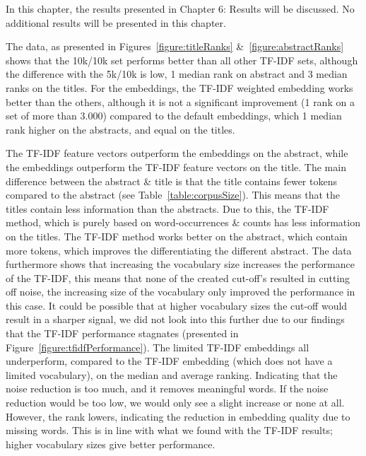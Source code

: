 \documentclass[../../Thesis.tex]{subfiles}
\begin{document}
In this chapter, the results presented in Chapter 6: Results will be discussed. No additional results will be presented in this chapter.

The data, as presented in Figures~\ref{figure:titleRanks} \&~\ref{figure:abstractRanks} shows that the 10k/10k set performs better than all other TF-IDF sets, although the difference with the 5k/10k is low, 1  median rank on abstract and 3 median ranks on the titles. For the embeddings, the TF-IDF weighted embedding works better than the others, although it is not a significant improvement (1 rank on a set of more than 3.000) compared to the default embeddings, which 1 median rank higher on the abstracts, and equal on the titles. 

The TF-IDF feature vectors outperform the embeddings on the abstract, while the embeddings outperform the TF-IDF feature vectors on the title. The main difference between the abstract \& title is that the title contains fewer tokens compared to the abstract (see Table~\ref{table:corpusSize}). This means that the titles contain less information than the abstracts. Due to this, the TF-IDF method, which is purely based on word-occurrences \& counts has less information on the titles. The TF-IDF method works better on the abstract, which contain more tokens, which improves the differentiating the different abstract. The data furthermore shows that increasing the vocabulary size increases the performance of the TF-IDF, this means that none of the created cut-off's resulted in cutting off noise, the increasing size of the vocabulary only improved the performance in this case. It could be possible that at higher vocabulary sizes the cut-off would result in a sharper signal, we did not look into this further due to our findings that the TF-IDF performance stagnates (presented in Figure~\ref{figure:tfidfPerformance}).
\clearpage
{}
The limited TF-IDF embeddings all underperform, compared to the TF-IDF embedding (which does not have a limited vocabulary), on the median and average ranking. Indicating that the noise reduction is too much, and it removes meaningful words. If the noise reduction would be too low, we would only see a slight increase or none at all. However, the rank lowers, indicating the reduction in embedding quality due to missing words. This is in line with what we found with the TF-IDF results; higher vocabulary sizes give better performance. 
\end{document}
